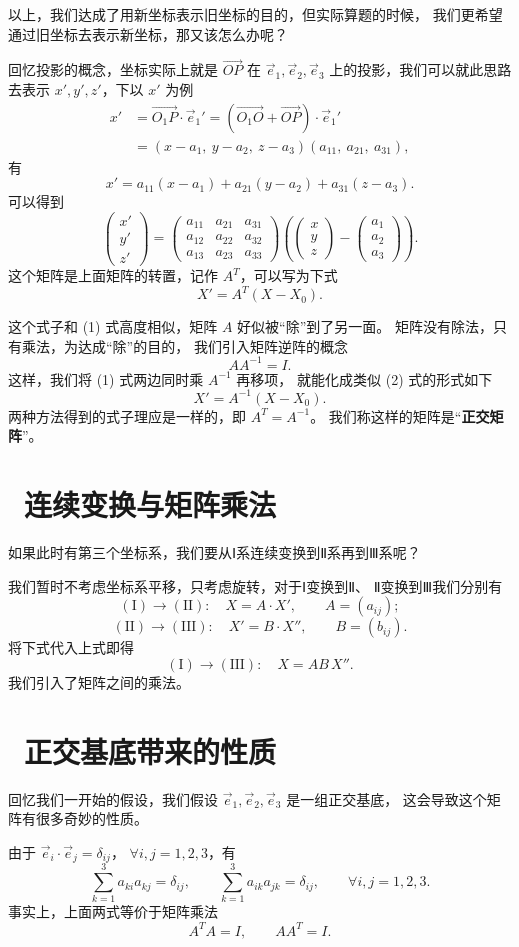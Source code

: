 \documentclass[UTF8,11pt]{ctexart}
\theoremstyle{cnthm}
\begin{document}
以上，我们达成了用新坐标表示旧坐标的目的，但实际算题的时候，
我们更希望通过旧坐标去表示新坐标，那又该怎么办呢？

回忆投影的概念，坐标实际上就是 $\overrightarrow{OP}$ 在
$\vec e_1,\vec e_2,\vec e_3$ 上的投影，我们可以就此思路去表示
$x',y',z'$，下以 $x'$ 为例
\[
\begin{aligned}
x'&=\overrightarrow{O_1P}\cdot\vec e_1'
=(\overrightarrow{O_1O}+\overrightarrow{OP})\cdot\vec e_1'\\
&=(x-a_1,\ y-a_2,\ z-a_3)(a_{11},\ a_{21},\ a_{31}),
\end{aligned}
\]
有
\[
x'=a_{11}(x-a_1)+a_{21}(y-a_2)+a_{31}(z-a_3).
\]
可以得到
\[
\begin{pmatrix}
x'\\y'\\z'
\end{pmatrix}
=
\begin{pmatrix}
a_{11} & a_{21} & a_{31}\\
a_{12} & a_{22} & a_{32}\\
a_{13} & a_{23} & a_{33}
\end{pmatrix}
\left(
\begin{pmatrix}
x\\y\\z
\end{pmatrix}
-
\begin{pmatrix}
a_1\\a_2\\a_3
\end{pmatrix}
\right).
\]
这个矩阵是上面矩阵的转置，记作 $A^T$，可以写为下式
\[
X'=A^T(X-X_0). \tag{2}
\]

这个式子和 (1) 式高度相似，矩阵 $A$ 好似被“除”到了另一面。
矩阵没有除法，只有乘法，为达成“除”的目的，
我们引入矩阵逆阵的概念
\[
AA^{-1}=I .
\]
这样，我们将 (1) 式两边同时乘 $A^{-1}$ 再移项，
就能化成类似 (2) 式的形式如下
\[
X'=A^{-1}(X-X_0).
\]
两种方法得到的式子理应是一样的，即 $A^T=A^{-1}$。
我们称这样的矩阵是“\textbf{正交矩阵}”。

\section{\ 连续变换与矩阵乘法}

如果此时有第三个坐标系，我们要从Ⅰ系连续变换到Ⅱ系再到Ⅲ系呢？

我们暂时不考虑坐标系平移，只考虑旋转，对于Ⅰ变换到Ⅱ、
Ⅱ变换到Ⅲ我们分别有
\[
(\mathrm{I})\to(\mathrm{II}):\quad X=A\cdot X',\qquad A=(a_{ij});
\]
\[
(\mathrm{II})\to(\mathrm{III}):\quad X'=B\cdot X'',\qquad B=(b_{ij}).
\]
将下式代入上式即得
\[
(\mathrm{I})\to(\mathrm{III}):\quad X=AB\,X'' .
\]
我们引入了矩阵之间的乘法。

\section{\ 正交基底带来的性质}

回忆我们一开始的假设，我们假设
$\vec e_1,\vec e_2,\vec e_3$ 是一组正交基底，
这会导致这个矩阵有很多奇妙的性质。

由于 $\vec e_i\cdot\vec e_j=\delta_{ij}$，
$\forall i,j=1,2,3$，有
\[
\sum_{k=1}^{3}a_{ki}a_{kj}=\delta_{ij},\qquad
\sum_{k=1}^{3}a_{ik}a_{jk}=\delta_{ij},
\qquad\forall i,j=1,2,3 .
\]
事实上，上面两式等价于矩阵乘法
\[
A^TA=I,\qquad AA^T=I .
\]
\end{document}
